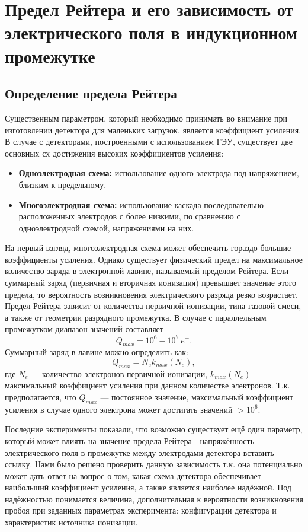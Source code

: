 \section{Предел Рейтера и его зависимость от электрического поля в индукционном промежутке}
\label{sec:raether_exp}
\subsection{Определение предела Рейтера}
Существенным параметром, который необходимо принимать во внимание при изготовлении детектора для маленьких загрузок, является коэффициент усиления. В случае с детекторами, построенными с использованием ГЭУ, существует две основных сх достижения высоких коэффициентов усиления: 
\begin{itemize}
	\item\textbf{Одноэлектродная схема:} использование одного электрода под напряжением, близким к предельному.
	\item\textbf{Многоэлектродная схема:} использование каскада последовательно расположенных электродов с более низкими, по сравнению с одноэлектродной схемой, напряжениями на них. 
\end{itemize}
\par На первый взгляд, многоэлектродная схема может обеспечить гораздо большие коэффициенты усиления. Однако существует физический предел на максимальное количество заряда в электронной лавине, называемый пределом Рейтера. Если суммарный заряд (первичная и вторичная ионизация) превышает значение этого предела, то вероятность возникновения электрического разряда резко возрастает. Предел Рейтера зависит от количества первичной ионизации, типа газовой смеси, а также от геометрии разрядного промежутка. 
В случае с параллельным промежутком диапазон значений составляет \cite{Peskov}
\begin{equation}
Q_{max} = 10^6-10^7~e^-.
\end{equation}
Суммарный заряд в лавине можно определить как: 
 \begin{equation}
 Q_{max} = N_e k_{max}(N_e),
 \label{Q(max)}
 \end{equation}
 где $N_e$ --- количество электронов первичной ионизации, $k_{max}(N_e)$ --- максимальный коэффициент усиления при данном количестве электронов. Т.к. предполагается, что $Q_{max}$ --- постоянное значение, максимальный коэффициент усиления в случае одного электрона может достигать значений $>10^6$. 
\par Последние эксперименты показали, что возможно существует ещё один параметр, который может влиять на значение предела Рейтера - напряжённость электрического поля в промежутке между электродами детектора {вставить ссылку}. Нами было решено проверить данную зависимость т.к. она потенциально может дать ответ на вопрос о том, какая схема детектора обеспечивает наибольший коэффициент усиления, а также является наиболее надёжной. Под надёжностью понимается величина, дополнительная к вероятности возникновения пробоя при заданных параметрах эксперимента: конфигурации детектора и характеристик источника ионизации. 
